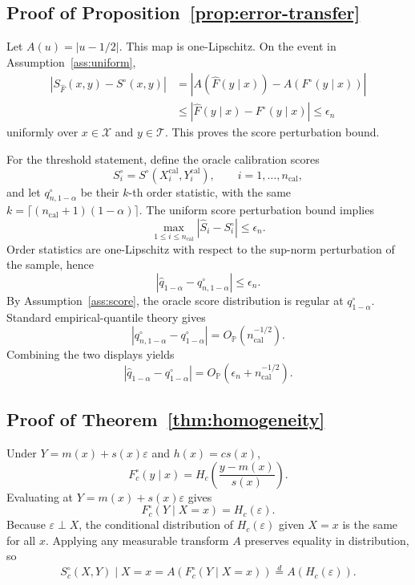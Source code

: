 \documentclass[11pt]{article}
\newcommand{\Xcal}{\mathcal X}
\newcommand{\Tcal}{\mathcal T}
\newcommand{\abs}[1]{\left\lvert #1 \right\rvert}
\newcommand{\Op}{O_{\mathbb P}}
\begin{document}
\subsection{Proof of Proposition~\ref{prop:error-transfer}}

Let \(A(u)=|u-1/2|\). This map is one-Lipschitz. On the event in Assumption~\ref{ass:uniform},
\[
\begin{aligned}
  \abs{S_{\widehat F}(x,y)-S^\circ(x,y)}
  &=
  \abs{A(\widehat F(y\mid x))-A(F^\circ(y\mid x))}  \\
  &\le
  \abs{\widehat F(y\mid x)-F^\circ(y\mid x)}
  \le \epsilon_n
\end{aligned}
\]
uniformly over \(x\in\Xcal\) and \(y\in\Tcal\). This proves the score perturbation bound.

For the threshold statement, define the oracle calibration scores
\[
  S_i^\circ=S^\circ(X_i^{\mathrm{cal}},Y_i^{\mathrm{cal}}),
  \qquad i=1,\ldots,n_{\mathrm{cal}},
\]
and let \(q_{n,1-\alpha}^\circ\) be their \(k\)-th order statistic, with the same \(k=\lceil(n_{\mathrm{cal}}+1)(1-\alpha)\rceil\). The uniform score perturbation bound implies
\[
  \max_{1\le i\le n_{\mathrm{cal}}}
  \abs{\widehat S_i-S_i^\circ}
  \le \epsilon_n.
\]
Order statistics are one-Lipschitz with respect to the sup-norm perturbation of the sample, hence
\[
  \abs{\widehat q_{1-\alpha}-q_{n,1-\alpha}^\circ}
  \le \epsilon_n.
\]
By Assumption~\ref{ass:score}, the oracle score distribution is regular at \(q^\circ_{1-\alpha}\). Standard empirical-quantile theory gives
\[
  \abs{q_{n,1-\alpha}^\circ-q^\circ_{1-\alpha}}
  =
  \Op(n_{\mathrm{cal}}^{-1/2}).
\]
Combining the two displays yields
\[
  \abs{\widehat q_{1-\alpha}-q^\circ_{1-\alpha}}
  =
  \Op(\epsilon_n+n_{\mathrm{cal}}^{-1/2}).
\]

\subsection{Proof of Theorem~\ref{thm:homogeneity}}

Under \(Y=m(x)+s(x)\varepsilon\) and \(h(x)=c s(x)\),
\[
  F_c^\circ(y\mid x)=
  H_c\!\left(\frac{y-m(x)}{s(x)}\right).
\]
Evaluating at \(Y=m(x)+s(x)\varepsilon\) gives
\[
  F_c^\circ(Y\mid X=x)
  =
  H_c(\varepsilon).
\]
Because \(\varepsilon\perp X\), the conditional distribution of \(H_c(\varepsilon)\) given \(X=x\) is the same for all \(x\). Applying any measurable transform \(A\) preserves equality in distribution, so
\[
  S_c^\circ(X,Y)\mid X=x
  =
  A(F_c^\circ(Y\mid X=x))
  \overset{d}{=}
  A(H_c(\varepsilon)).
\]
\end{document}
